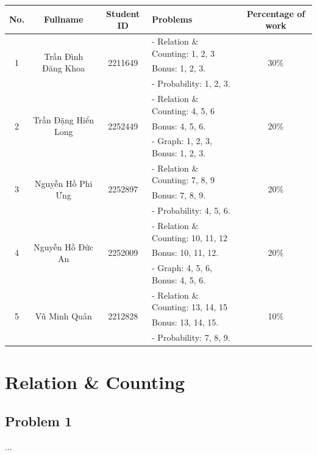 \documentclass[a4paper]{article}
\begin{document}
\begin{center}
\begin{tabular}{|c|c|c|l|c|}
\hline
\textbf{No.} & \textbf{Fullname} & \textbf{Student ID} & \textbf{Problems} & \textbf{Percentage of work}\\
\hline 
\multirow{3}{*}{1} & \multirow{3}{*}{Trần Đình Đăng Khoa} & \multirow{3}{*}{2211649} & - Relation \& Counting: 1, 2, 3& \multirow{3}{*}{30\%}\\
 & &  & Bonus: 1, 2, 3. &\\
 & &  & - Probability: 1, 2, 3. &\\
\hline 
\multirow{3}{*}{2} & \multirow{3}{*}{Trần Đặng Hiển Long} & \multirow{3}{*}{2252449} & - Relation \& Counting: 4, 5, 6& \multirow{3}{*}{20\%}\\
 & &  & Bonus: 4, 5, 6. &\\
 & &  & - Graph: 1, 2, 3, Bonus: 1, 2, 3. &\\
\hline
\multirow{3}{*}{3} & \multirow{3}{*}{Nguyễn Hồ Phi Ưng} & \multirow{3}{*}{2252897} & - Relation \& Counting: 7, 8, 9& \multirow{3}{*}{20\%}\\
 & &  & Bonus: 7, 8, 9. &\\
 & &  & - Probability: 4, 5, 6. &\\
\hline
\multirow{3}{*}{4} & \multirow{3}{*}{Nguyễn Hồ Đức An} & \multirow{3}{*}{2252009} & - Relation \& Counting: 10, 11, 12& \multirow{3}{*}{20\%}\\
 & &  & Bonus: 10, 11, 12. &\\
 & &  & - Graph: 4, 5, 6, Bonus: 4, 5, 6. &\\
\hline
\multirow{3}{*}{5} & \multirow{3}{*}{Vũ Minh Quân} & \multirow{3}{*}{2212828} & - Relation \& Counting: 13, 14, 15& \multirow{3}{*}{10\%}\\
 & &  & Bonus: 13, 14, 15. &\\
 & &  & - Probability: 7, 8, 9. &\\
\hline
\end{tabular}
\end{center}

\section{Relation \& Counting}
	\subsection{Problem 1}
	...
	
\end{document}

